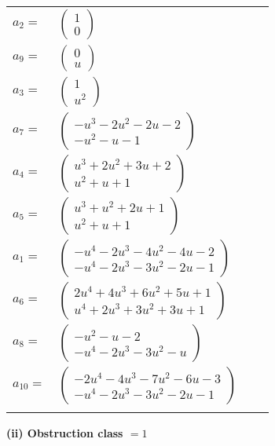 \documentclass[1p]{elsarticle_modified}
\theoremstyle{definition}
\begin{document}
\begin{tabular}{m{7pt} m{180pt} m{7pt} m{180pt} }
\flushright $a_{2}=$&$\begin{pmatrix}1\\0\end{pmatrix}$ \\
\flushright $a_{9}=$&$\begin{pmatrix}0\\u\end{pmatrix}$ \\
\flushright $a_{3}=$&$\begin{pmatrix}1\\u^2\end{pmatrix}$ \\
\flushright $a_{7}=$&$\begin{pmatrix}- u^3-2 u^2-2 u-2\\- u^2- u-1\end{pmatrix}$ \\
\flushright $a_{4}=$&$\begin{pmatrix}u^3+2 u^2+3 u+2\\u^2+u+1\end{pmatrix}$ \\
\flushright $a_{5}=$&$\begin{pmatrix}u^3+u^2+2 u+1\\u^2+u+1\end{pmatrix}$ \\
\flushright $a_{1}=$&$\begin{pmatrix}- u^4-2 u^3-4 u^2-4 u-2\\- u^4-2 u^3-3 u^2-2 u-1\end{pmatrix}$ \\
\flushright $a_{6}=$&$\begin{pmatrix}2 u^4+4 u^3+6 u^2+5 u+1\\u^4+2 u^3+3 u^2+3 u+1\end{pmatrix}$ \\
\flushright $a_{8}=$&$\begin{pmatrix}- u^2- u-2\\- u^4-2 u^3-3 u^2- u\end{pmatrix}$ \\
\flushright $a_{10}=$&$\begin{pmatrix}-2 u^4-4 u^3-7 u^2-6 u-3\\- u^4-2 u^3-3 u^2-2 u-1\end{pmatrix}$\\&\end{tabular}
\flushleft \textbf{(ii) Obstruction class $= 1$}\\~\\
\end{document}
